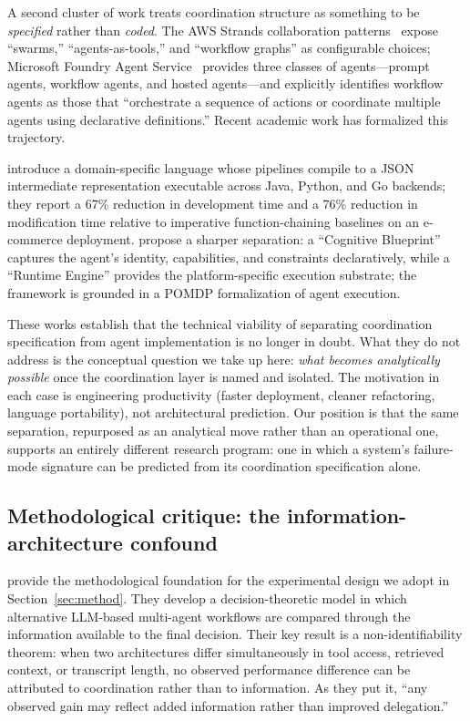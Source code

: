 \documentclass[11pt]{article}
\begin{document}
A second cluster of work treats coordination structure as something to be \emph{specified} rather than \emph{coded}. The AWS Strands collaboration patterns~\citep{strands2025} expose ``swarms,'' ``agents-as-tools,'' and ``workflow graphs'' as configurable choices; Microsoft Foundry Agent Service~\citep{foundry2026} provides three classes of agents---prompt agents, workflow agents, and hosted agents---and explicitly identifies workflow agents as those that ``orchestrate a sequence of actions or coordinate multiple agents using declarative definitions.'' Recent academic work has formalized this trajectory.

\citet{daunis2025declarative} introduce a domain-specific language whose pipelines compile to a JSON intermediate representation executable across Java, Python, and Go backends; they report a 67\% reduction in development time and a 76\% reduction in modification time relative to imperative function-chaining baselines on an e-commerce deployment. \citet{auton2026} propose a sharper separation: a ``Cognitive Blueprint'' captures the agent's identity, capabilities, and constraints declaratively, while a ``Runtime Engine'' provides the platform-specific execution substrate; the framework is grounded in a POMDP formalization of agent execution.

These works establish that the technical viability of separating coordination specification from agent implementation is no longer in doubt. What they do not address is the conceptual question we take up here: \emph{what becomes analytically possible} once the coordination layer is named and isolated. The motivation in each case is engineering productivity (faster deployment, cleaner refactoring, language portability), not architectural prediction. Our position is that the same separation, repurposed as an analytical move rather than an operational one, supports an entirely different research program: one in which a system's failure-mode signature can be predicted from its coordination specification alone.

\subsection{Methodological critique: the information-architecture confound}
\label{sec:related-confound}

\citet{reliability2026} provide the methodological foundation for the experimental design we adopt in Section~\ref{sec:method}. They develop a decision-theoretic model in which alternative LLM-based multi-agent workflows are compared through the information available to the final decision. Their key result is a non-identifiability theorem: when two architectures differ simultaneously in tool access, retrieved context, or transcript length, no observed performance difference can be attributed to coordination rather than to information. As they put it, ``any observed gain may reflect added information rather than improved delegation.''
\end{document}
